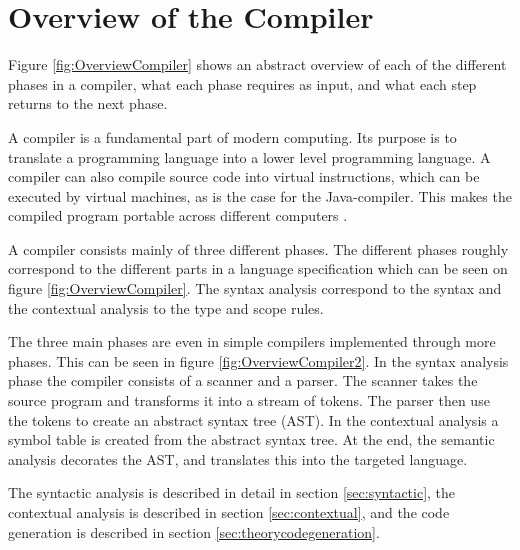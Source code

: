 \section{Overview of the Compiler}
\label{sec:OverviewCompiler}
Figure \ref{fig:OverviewCompiler} shows an abstract overview of each of the different phases in a compiler, what each phase requires as input, and what each step returns to the next phase.

A compiler is a fundamental part of modern computing. Its purpose is to translate a programming language into a lower level programming language. A compiler can also compile source code into virtual instructions, which can be executed by virtual machines, as is the case for the Java-compiler. This makes the compiled program portable across different computers \citep{CraftingACompiler}.

A compiler consists mainly of three different phases. The different phases roughly correspond to the different parts in a language specification which can be seen on figure \ref{fig:OverviewCompiler}. The syntax analysis correspond to the syntax and the contextual analysis to the type and scope rules.

The three main phases are even in simple compilers implemented through more phases. This can be seen in figure \ref{fig:OverviewCompiler2}. In the syntax analysis phase the compiler consists of a scanner and a parser. The scanner takes the source program and transforms it into a stream of tokens. The parser then use the tokens to create an abstract syntax tree (AST). In the contextual analysis a symbol table is created from the abstract syntax tree. At the end, the semantic analysis decorates the AST, and translates this into the targeted language.

The syntactic analysis is described in detail in section \ref{sec:syntactic}, the contextual analysis is described in section \ref{sec:contextual}, and the code generation is described in section \ref{sec:theorycodegeneration}.

